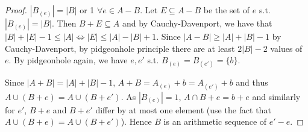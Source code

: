 \documentclass[a4paper]{article}
\begin{document}
\begin{proof}
	$|B_{(e)}| = |B|$ or 1 $\forall e \in A-B$.
	Let $E \subseteq A - B$ be the set of $e $ s.t. $|B_{(e)}| = |B| $.
	Then $B + E \subseteq A $ and by Cauchy-Davenport, we have that $|B| + |E| - 1 \le |A| \iff |E| \le |A| - |B| + 1 $.
	Since $|A - B| \ge |A| + |B| - 1 $ by Cauchy-Davenport, by pidgeonhole principle there are at least $2|B| - 2$ values of $e $.
	By pidgeonhole again, we have $e,e' $ s.t. $B_{(e)} = B_{(e')} = \{b\} $.

	Since $|A+B| = |A| + |B| - 1 $, $A+B = A_{(e)} + b = A_{(e')} + b $ and thus $A\cup (B+e) = A \cup (B+e') $.
	As $|B_{(e)}| = 1 $, $A \cap B+e = b + e$ and similarly for $e' $, $B+e $ and $B+e' $ differ by at most one element (use the fact that $A\cup (B+e) = A \cup (B+e')$).
	Hence $B $ is an arithmetic sequence of $e' - e $.
\end{proof}
\end{document}
